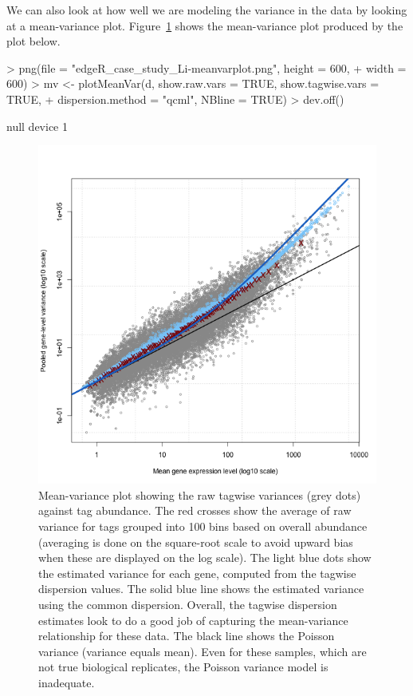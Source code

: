 We can also look at how well we are modeling the variance in the data
by looking at a mean-variance plot. Figure~\ref{fig:Li_meanvarplot} shows the
mean-variance plot produced by the plot below.

\begin{Schunk}
\begin{Sinput}
> png(file = "edgeR_case_study_Li-meanvarplot.png", height = 600, 
+     width = 600)
> mv <- plotMeanVar(d, show.raw.vars = TRUE, show.tagwise.vars = TRUE, 
+     dispersion.method = "qcml", NBline = TRUE)
> dev.off()
\end{Sinput}
\begin{Soutput}
null device 
          1 
\end{Soutput}
\end{Schunk}



\begin{figure}[ht]
\begin{center}
\includegraphics{edgeR_case_study_Li-meanvarplot.png}
\caption{Mean-variance plot showing the raw tagwise variances (grey
  dots) against tag abundance. The red crosses show the average of raw
  variance for tags grouped into 100 bins based on overall abundance
  (averaging is done on the square-root scale to avoid upward bias
  when these are displayed on the log scale). The light blue dots show
  the estimated variance for each gene, computed from the tagwise
  dispersion values. The solid blue line shows the estimated variance
  using the common dispersion. Overall, the tagwise dispersion
  estimates look to do a good job of capturing the mean-variance
  relationship for these data. The black line shows the Poisson
  variance (variance equals mean). Even for these samples, which are
  not true biological replicates, the Poisson variance model is inadequate.}
\label{fig:Li_meanvarplot}
\end{center}
\end{figure}




